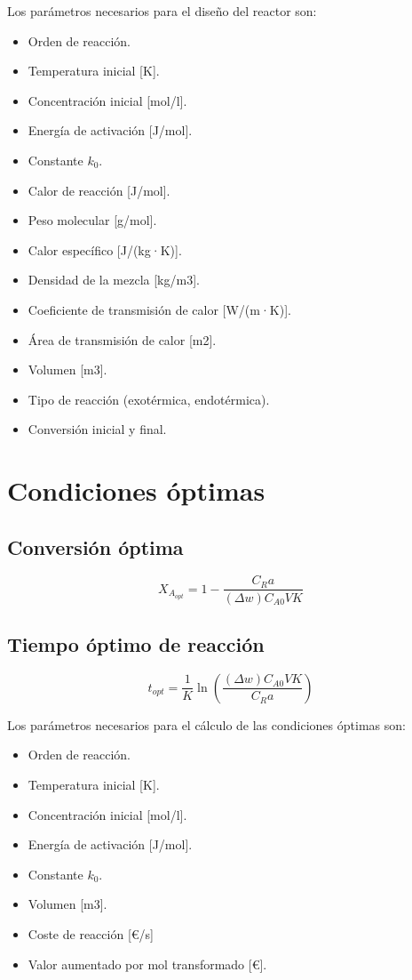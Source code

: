 \documentclass[20pt,a4paper]{extarticle}
\begin{document}
		Los parámetros necesarios para el diseño del reactor son:
		
		\begin{itemize}
			\item Orden de reacción.
			\item Temperatura inicial [K].
			\item Concentración inicial [mol/l].
			\item Energía de activación [J/mol].
			\item Constante $k_0$.
			\item Calor de reacción [J/mol].
			\item Peso molecular [g/mol].
			\item Calor específico [J/(kg·K)].
			\item Densidad de la mezcla [kg/m3].
			\item Coeficiente de transmisión de calor [W/(m·K)].
			\item Área de transmisión de calor [m2].
			\item Volumen [m3]. 
			\item Tipo de reacción (exotérmica, endotérmica).
			\item Conversión inicial y final.
		\end{itemize}
			
\section{Condiciones óptimas}
	\subsection{Conversión óptima}
		\begin{equation*}
			X_{A_{opt}} = 1- \frac{C_R a}{(\Delta w) C_{A0}VK}
		\end{equation*}		
		
	\subsection{Tiempo óptimo de reacción}
		\begin{equation*}
			t_{opt} = \frac{1}{K}\ln \left(\frac{(\Delta w)C_{A0}VK}{C_R a}\right)
		\end{equation*}
		
		
		Los parámetros necesarios para el cálculo de las condiciones óptimas son:
		
		\begin{itemize}
			\item Orden de reacción.
			\item Temperatura inicial [K].
			\item Concentración inicial [mol/l].
			\item Energía de activación [J/mol].
			\item Constante $k_0$.
			\item Volumen [m3]. 
			\item Coste de reacción [\euro/s]
			\item Valor aumentado por mol transformado [\euro].
		\end{itemize}
		
\end{document}

